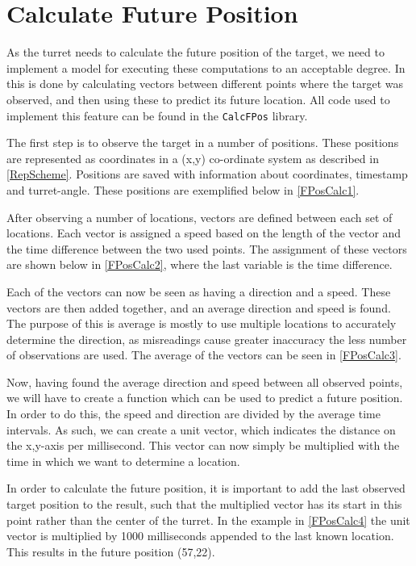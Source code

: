 \section{Calculate Future Position}
As the turret needs to calculate the future position of the target, we need to
implement a model for executing these computations to an acceptable degree. In
\name this is done by calculating vectors between different points where the
target was observed, and then using these to predict its future location. All
code used to implement this feature can be found in the \texttt{CalcFPos}
library.\nl

The first step is to observe the target in a number of positions. These
positions are represented as coordinates in a (x,y) co-ordinate system as
described in \autoref{RepScheme}. Positions are saved with information about coordinates,
timestamp and turret-angle. These positions are exemplified below in
\autoref{FPosCalc1}.


After observing a number of locations, vectors are defined between each set of
locations. Each vector is assigned a speed based on the length of the vector and
the time difference between the two used points. The assignment of these vectors
are shown below in \autoref{FPosCalc2}, where the last variable is the time
difference.


Each of the vectors can now be seen as having a direction and a speed. These
vectors are then added together, and an average direction and speed is found.
The purpose of this is average is mostly to use multiple locations to accurately
determine the direction, as misreadings cause greater inaccuracy the less number
of observations are used. The average of the vectors can be seen in
\autoref{FPosCalc3}.


Now, having found the average direction and speed between all observed points,
we will have to create a function which can be used to predict a future
position. In order to do this, the speed and direction are divided by the
average time intervals. As such, we can create a unit vector, which indicates the
distance on the x,y-axis per millisecond. This vector can now simply be
multiplied with the time in which we want to determine a location. 


In order to calculate the future position, it is important to add the last
observed target position to the result, such that the multiplied vector has its
start in this point rather than the center of the turret. In the example in
\autoref{FPosCalc4} the unit vector is multiplied by 1000 milliseconds appended
to the last known location. This results in the future position (57,22).




